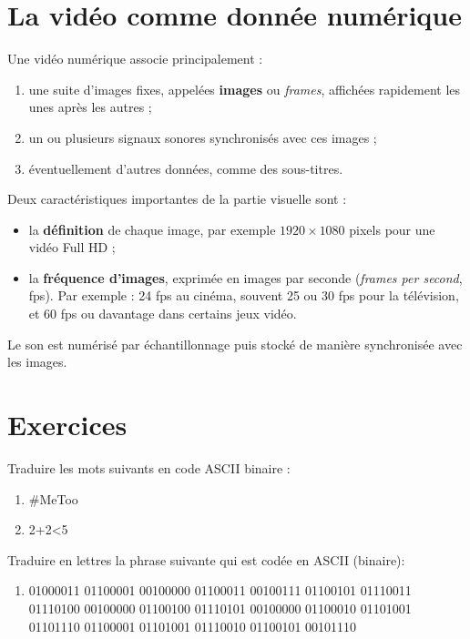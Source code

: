 \documentclass[11pt, a4paper]{book}
\begin{document}
\section{La vidéo comme donnée numérique}

Une vidéo numérique associe principalement :
\begin{enumerate}
    \item une suite d'images fixes, appelées \textbf{images} ou \textit{frames},
    affichées rapidement les unes après les autres ;
    \item un ou plusieurs signaux sonores synchronisés avec ces images ;
    \item éventuellement d'autres données, comme des sous-titres.
\end{enumerate}

Deux caractéristiques importantes de la partie visuelle sont :
\begin{itemize}
    \item la \textbf{définition} de chaque image, par exemple $1920 \times 1080$ pixels
    pour une vidéo Full HD ;
    \item la \textbf{fréquence d'images}, exprimée en images par seconde
    (\textit{frames per second}, fps). Par exemple : 24 fps au cinéma, souvent 25 ou
    30 fps pour la télévision, et 60 fps ou davantage dans certains jeux vidéo.
\end{itemize}

Le son est numérisé par échantillonnage puis stocké de manière synchronisée avec les
images.


\section{Exercices}


\iffalse   %
\begin{exercice}
Traduire les mots suivants en code ASCII binaire :
\begin{enumerate}
\item \#MeToo
\item 2+2<5
\end{enumerate}
\end{exercice}

\begin{exercice}
Traduire en lettres la phrase suivante qui est codée en ASCII (binaire):
\begin{enumerate}
\item 01000011 01100001 00100000 01100011 00100111 01100101 01110011 01110100 00100000 01100100 01110101 00100000 01100010 01101001 01101110 01100001 01101001 01110010 01100101 00101110
\end{enumerate}
\end{exercice}
\end{document}
